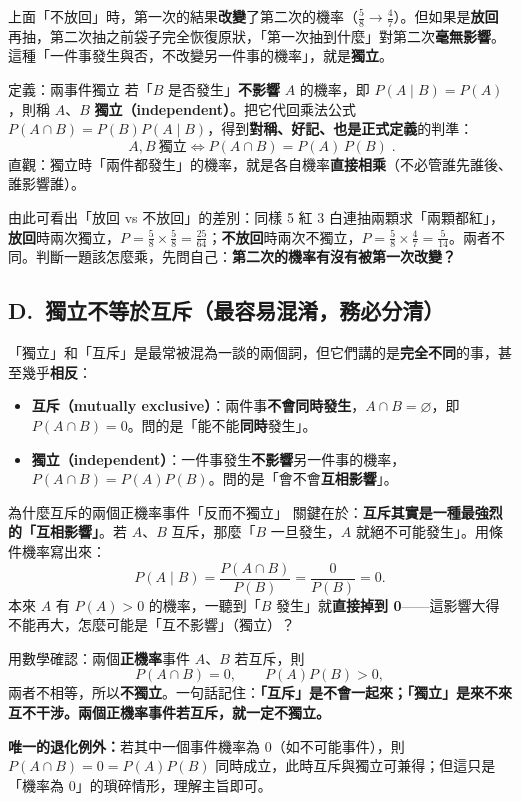 \documentclass[11pt]{article}
\begin{document}
上面「不放回」時，第一次的結果\textbf{改變}了第二次的機率（$\frac58\to\frac47$）。但如果是\textbf{放回}再抽，第二次抽之前袋子完全恢復原狀，「第一次抽到什麼」對第二次\textbf{毫無影響}。這種「一件事發生與否，不改變另一件事的機率」，就是\textbf{獨立}。

\begin{補充框}{定義：兩事件獨立}
若「$B$ 是否發生」\textbf{不影響} $A$ 的機率，即 $P(A\mid B)=P(A)$，則稱 $A$、$B$ \textbf{獨立（independent）}。把它代回乘法公式 $P(A\cap B)=P(B)P(A\mid B)$，得到\textbf{對稱、好記、也是正式定義}的判準：
$$\boxed{\;A,B\ \text{獨立}\iff P(A\cap B)=P(A)\,P(B)\;}.$$
直觀：獨立時「兩件都發生」的機率，就是各自機率\textbf{直接相乘}（不必管誰先誰後、誰影響誰）。
\end{補充框}

由此可看出「放回 vs 不放回」的差別：同樣 5 紅 3 白連抽兩顆求「兩顆都紅」，\textbf{放回}時兩次獨立，$P=\frac58\times\frac58=\frac{25}{64}$；\textbf{不放回}時兩次不獨立，$P=\frac58\times\frac47=\frac{5}{14}$。兩者不同。判斷一題該怎麼乘，先問自己：\textbf{第二次的機率有沒有被第一次改變？}

\subsection*{\sffamily D.\ 獨立不等於互斥（最容易混淆，務必分清）}

「獨立」和「互斥」是最常被混為一談的兩個詞，但它們講的是\textbf{完全不同}的事，甚至幾乎\textbf{相反}：

\begin{itemize}\setlength{\itemsep}{1pt}
\item \textbf{互斥（mutually exclusive）}：兩件事\textbf{不會同時發生}，$A\cap B=\varnothing$，即 $P(A\cap B)=0$。問的是「能不能\textbf{同時}發生」。
\item \textbf{獨立（independent）}：一件事發生\textbf{不影響}另一件事的機率，$P(A\cap B)=P(A)P(B)$。問的是「會不會\textbf{互相影響}」。
\end{itemize}


\begin{補充框}{為什麼互斥的兩個正機率事件「反而不獨立」}
關鍵在於：\textbf{互斥其實是一種最強烈的「互相影響」}。若 $A$、$B$ 互斥，那麼「$B$ 一旦發生，$A$ 就絕不可能發生」。用條件機率寫出來：
$$P(A\mid B)=\frac{P(A\cap B)}{P(B)}=\frac{0}{P(B)}=0.$$
本來 $A$ 有 $P(A)>0$ 的機率，一聽到「$B$ 發生」就\textbf{直接掉到 0}——這影響大得不能再大，怎麼可能是「互不影響」（獨立）？

用數學確認：兩個\textbf{正機率}事件 $A$、$B$ 若互斥，則
$$P(A\cap B)=0,\qquad P(A)P(B)>0,$$
兩者不相等，所以\textbf{不獨立}。一句話記住：\textbf{「互斥」是不會一起來；「獨立」是來不來互不干涉。兩個正機率事件若互斥，就一定不獨立。}

\textbf{唯一的退化例外：}若其中一個事件機率為 0（如不可能事件），則 $P(A\cap B)=0=P(A)P(B)$ 同時成立，此時互斥與獨立可兼得；但這只是「機率為 0」的瑣碎情形，理解主旨即可。
\end{補充框}
\end{document}
